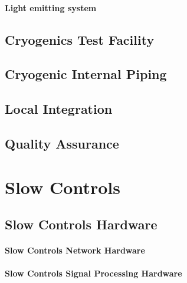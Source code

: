 \paragraph{Light emitting system}


\subsection{Cryogenics Test Facility}
\label{sec:fddp-slow-cryo-test-facil}

\subsection{Cryogenic Internal Piping}
\label{sec:fddp-slow-cryo-int-piping}

\subsection{Local Integration}
\label{sec:fddp-slow-cryo-loc-integ}


\subsection{Quality Assurance}
\label{sec:fddp-slow-cryo-qa}



\section{Slow Controls}
\label{sec:fddp-slow-cryo-ctrl}




\subsection{Slow Controls Hardware}
\label{sec:fddp-slow-cryo-hdwr}

\paragraph{Slow Controls Network Hardware}

\paragraph{Slow Controls Signal Processing Hardware}

